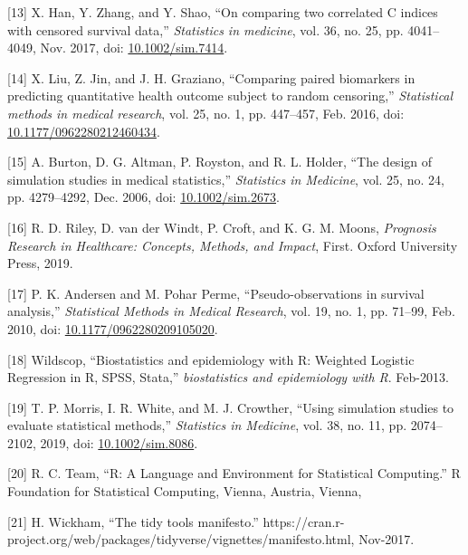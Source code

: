 \documentclass[
]{article}
\newenvironment{cslreferences}%
  {}%
  {\par}
\begin{document}
\begin{cslreferences}
\leavevmode\hypertarget{ref-han_comparing_2017}{}%
{[}13{]} X. Han, Y. Zhang, and Y. Shao, ``On comparing two correlated C indices with censored survival data,'' \emph{Statistics in medicine}, vol. 36, no. 25, pp. 4041--4049, Nov. 2017, doi: \href{https://doi.org/10.1002/sim.7414}{10.1002/sim.7414}.

\leavevmode\hypertarget{ref-liu_comparing_2016}{}%
{[}14{]} X. Liu, Z. Jin, and J. H. Graziano, ``Comparing paired biomarkers in predicting quantitative health outcome subject to random censoring,'' \emph{Statistical methods in medical research}, vol. 25, no. 1, pp. 447--457, Feb. 2016, doi: \href{https://doi.org/10.1177/0962280212460434}{10.1177/0962280212460434}.

\leavevmode\hypertarget{ref-burton_design_2006}{}%
{[}15{]} A. Burton, D. G. Altman, P. Royston, and R. L. Holder, ``The design of simulation studies in medical statistics,'' \emph{Statistics in Medicine}, vol. 25, no. 24, pp. 4279--4292, Dec. 2006, doi: \href{https://doi.org/10.1002/sim.2673}{10.1002/sim.2673}.

\leavevmode\hypertarget{ref-riley_prognosis_2019}{}%
{[}16{]} R. D. Riley, D. van der Windt, P. Croft, and K. G. M. Moons, \emph{Prognosis Research in Healthcare: Concepts, Methods, and Impact}, First. Oxford University Press, 2019.

\leavevmode\hypertarget{ref-andersen_pseudo-observations_2010}{}%
{[}17{]} P. K. Andersen and M. Pohar Perme, ``Pseudo-observations in survival analysis,'' \emph{Statistical Methods in Medical Research}, vol. 19, no. 1, pp. 71--99, Feb. 2010, doi: \href{https://doi.org/10.1177/0962280209105020}{10.1177/0962280209105020}.

\leavevmode\hypertarget{ref-wildscop_biostatistics_2013}{}%
{[}18{]} Wildscop, ``Biostatistics and epidemiology with R: Weighted Logistic Regression in R, SPSS, Stata,'' \emph{biostatistics and epidemiology with R}. Feb-2013.

\leavevmode\hypertarget{ref-morris_using_2019}{}%
{[}19{]} T. P. Morris, I. R. White, and M. J. Crowther, ``Using simulation studies to evaluate statistical methods,'' \emph{Statistics in Medicine}, vol. 38, no. 11, pp. 2074--2102, 2019, doi: \href{https://doi.org/10.1002/sim.8086}{10.1002/sim.8086}.

\leavevmode\hypertarget{ref-r_core_team_r_nodate}{}%
{[}20{]} R. C. Team, ``R: A Language and Environment for Statistical Computing.'' R Foundation for Statistical Computing, Vienna, Austria, Vienna,

\leavevmode\hypertarget{ref-wickham_tidy_2017}{}%
{[}21{]} H. Wickham, ``The tidy tools manifesto.'' https://cran.r-project.org/web/packages/tidyverse/vignettes/manifesto.html, Nov-2017.


\end{cslreferences}
\end{document}
